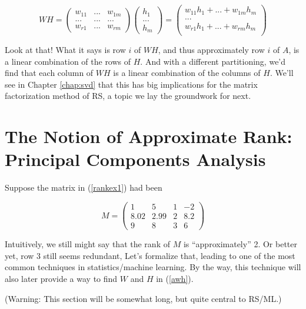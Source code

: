 \begin{equation}
WH =
\left (
\begin{array}{ccc}
w_{11} & ... & w_{1m}\\
... & ... & ... \\
w_{r1} & ... & w_{rm}
\end{array}
\right )
\left (
\begin{array}{cc}
h_1 \\
... \\
h_m 
\end{array}
\right )
=
\left (
\begin{array}{cc}
w_{11}h_1 + ... + w_{1m} h_m \\
... \\
w_{r1}h_1 + ... + w_{rm} h_m \\
\end{array}
\right )
\end{equation}

Look at that!  What it says is row $i$ of $WH$, and thus approximately
row $i$ of $A$, is a linear combination of the rows of $H$.  And with a
different partitioning, we'd find that each column of $WH$ is a linear
combination of the columns of $H$.  We'll see in Chapter \ref{chap:svd}
that this has big implications for the matrix factorization method of
RS, a topic we lay the groundwork for next.

\section{The Notion of Approximate Rank:  Principal Components
Analysis}

Suppose the matrix in (\ref{rankex1}) had been

\begin{equation}
\label{rankex2}
M =
\left (
\begin{array}{rrrr}
1 & 5 & 1 & -2\\
8.02 & 2.99 & 2 & 8.2\\
9 & 8 & 3 & 6 
\end{array}
\right )
\end{equation}

Intuitively, we still might say that the rank of $M$ is
``approximately'' 2.  Or better yet, row 3 still seems redundant, Let's
formalize that, leading to one of the most common techniques in
statistics/machine learning.  By the way, this technique will also later
provide a way to find $W$ and $H$ in (\ref{awh}).

(Warning:  This section will be somewhat long, but quite central to
RS/ML.)

